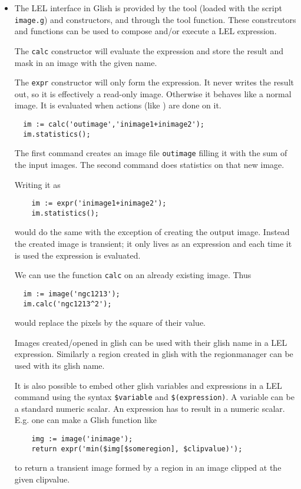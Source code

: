 \begin{itemize}
\item

The LEL interface in Glish is provided by the
 tool (loaded with the script
\texttt{image.g})  and
 constructors, and through
the  tool function. 
These constrcutors and functions can be used
to compose and/or execute a LEL expression.

\medskip\noindent The \texttt{calc} constructor will evaluate the expression and store
the result and mask in an image with the given name.

\medskip\noindent The \texttt{expr} constructor will only form the expression.  It never
writes the result out, so it is effectively a read-only image. 
Otherwise it behaves like a normal image.  It is evaluated when actions
(like ) are done on it. 

\begin{verbatim}
  im := calc('outimage','inimage1+inimage2');
  im.statistics();
\end{verbatim}

\medskip\noindent The first command creates an image file \texttt{outimage} filling
it with the sum of the input images. The second command does
statistics on that new image.

\medskip\noindent Writing it as
\begin{verbatim}
    im := expr('inimage1+inimage2');
    im.statistics();
\end{verbatim}
would do the same with the exception of creating the output image.
Instead the created image is transient; it only lives as an
expression and each time it is used the expression is evaluated.

\medskip\noindent We can use the function {\tt calc} on an already existing image.  Thus
\begin{verbatim}
  im := image('ngc1213');
  im.calc('ngc1213^2');
\end{verbatim}
would replace the pixels by the square of their value.

\medskip\noindent Images created/opened in glish can be used with their glish name
in a LEL expression. Similarly a region created in glish with the
regionmanager can be used with its glish name.

\medskip\noindent It is also possible to embed other glish variables and expressions in
a LEL command using the syntax \texttt{\$variable} and
\texttt{\$(expression)}. A variable can be a standard numeric scalar.
An expression has to result in a numeric scalar.
E.g. one can make a Glish function like
\begin{verbatim}
    img := image('inimage');
    return expr('min($img[$someregion], $clipvalue)');
\end{verbatim}
to return a transient image formed by a region in an image clipped at the
given clipvalue.


\end{itemize}
